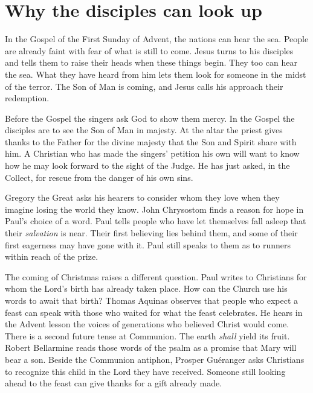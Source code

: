 \section{Why the disciples can look up}

In the Gospel of the First Sunday of Advent, the nations can hear the sea. People are already faint with fear of what is still to come. Jesus turns to his disciples and tells them to raise their heads when these things begin. They too can hear the sea. What they have heard from him lets them look for someone in the midst of the terror. The Son of Man is coming, and Jesus calls his approach their redemption.

Before the Gospel the singers ask God to show them mercy. In the Gospel the disciples are to see the Son of Man in majesty. At the altar the priest gives thanks to the Father for the divine majesty that the Son and Spirit share with him. A Christian who has made the singers' petition his own will want to know how he may look forward to the sight of the Judge. He has just asked, in the Collect, for rescue from the danger of his own sins.

Gregory the Great asks his hearers to consider whom they love when they imagine losing the world they know. John Chrysostom finds a reason for hope in Paul's choice of a word. Paul tells people who have let themselves fall asleep that their \emph{salvation} is near. Their first believing lies behind them, and some of their first eagerness may have gone with it. Paul still speaks to them as to runners within reach of the prize.

The coming of Christmas raises a different question. Paul writes to Christians for whom the Lord's birth has already taken place. How can the Church use his words to await that birth? Thomas Aquinas observes that people who expect a feast can speak with those who waited for what the feast celebrates. He hears in the Advent lesson the voices of generations who believed Christ would come. There is a second future tense at Communion. The earth \emph{shall} yield its fruit. Robert Bellarmine reads those words of the psalm as a promise that Mary will bear a son. Beside the Communion antiphon, Prosper Guéranger asks Christians to recognize this child in the Lord they have received. Someone still looking ahead to the feast can give thanks for a gift already made.

